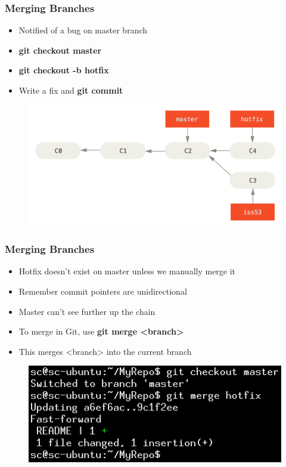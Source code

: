 \documentclass{beamer}
\begin{document}
\begin{frame}
	\frametitle{Merging Branches}
	\begin{itemize}
		\item{Notified of a bug on master branch}
		\item{\textbf{git checkout master}}
		\item{\textbf{git checkout -b hotfix}}
		\item{Write a fix and \textbf{git commit}}
	\end{itemize}
	\begin{figure}
		\includegraphics[scale=0.4]{Merging_Branches-2.png}
	\end{figure}
\end{frame}

\begin{frame}
	\frametitle{Merging Branches}
	\begin{itemize}
		\item{Hotfix doesn't exist on master unless we manually merge it}
		\item{Remember commit pointers are unidirectional}
		\item{Master can't see further up the chain}
		\item{To merge in Git, use \textbf{git merge \textless{}branch\textgreater{}}}
		\item{This merges \textless{}branch\textgreater{} into the current branch}
	\end{itemize}
	\begin{figure}
		\includegraphics[scale=0.5]{Merging_Branches-3.png}
	\end{figure}
\end{frame}
\end{document}
